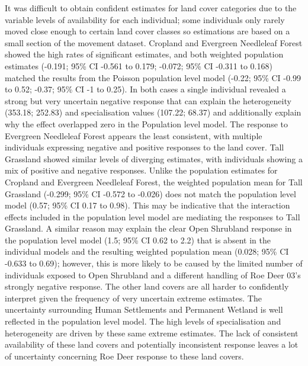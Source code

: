 \documentclass[10pt,a4paper]{article}
\begin{document}
It was difficult to obtain confident estimates for land cover categories due to the variable levels of availability for each individual; some individuals only rarely moved close enough to certain land cover classes so estimations are based on a small section of the movement dataset.
Cropland and Evergreen Needleleaf Forest showed the high rates of significant estimates, and both weighted population estimates (-0.191; 95\% CI -0.561 to 0.179; -0.072; 95\% CI -0.311 to 0.168) matched the results from the Poisson population level model (-0.22; 95\% CI -0.99 to 0.52; -0.37; 95\% CI -1 to 0.25).
In both cases a single individual revealed a strong but very uncertain negative response that can explain the heterogeneity (353.18; 252.83) and specialisation values (107.22; 68.37) and additionally explain why the effect overlapped zero in the Population level model.
The response to Evergreen Needleleaf Forest appears the least consistent, with multiple individuals expressing negative and positive responses to the land cover.
Tall Grassland showed similar levels of diverging estimates, with individuals showing a mix of positive and negative responses.
Unlike the population estimates for Cropland and Evergreen Needleleaf Forest, the weighted population mean for Tall Grassland (-0.299; 95\% CI -0.572 to -0.026) does not match the population level model (0.57; 95\% CI 0.17 to 0.98).
This may be indicative that the interaction effects included in the population level model are mediating the responses to Tall Grassland.
A similar reason may explain the clear Open Shrubland response in the population level model (1.5; 95\% CI 0.62 to 2.2) that is absent in the individual models and the resulting weighted population mean (0.028; 95\% CI -0.633 to 0.69); however, this is more likely to be caused by the limited number of individuals exposed to Open Shrubland and a different handling of Roe Deer 03's strongly negative response.
The other land covers are all harder to confidently interpret given the frequency of very uncertain extreme estimates.
The uncertainty surrounding Human Settlements and Permanent Wetland is well reflected in the population level model.
The high levels of specialisation and heterogeneity are driven by these same extreme estimates.
The lack of consistent availability of these land covers and potentially inconsistent response leaves a lot of uncertainty concerning Roe Deer response to these land covers.
\end{document}
